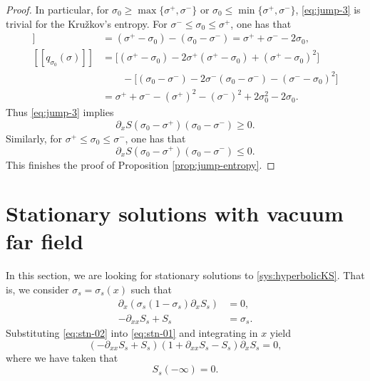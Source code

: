 \documentclass[12pt]{article}
\theoremstyle{definition}
\theoremstyle{remark}
\newcommand{\dx}{\partial_x}
\numberwithin{equation}{section}
\begin{document}
\begin{proof}
In particular, for $ \sigma_0 \geq \max\lbrace \sigma^+, \sigma^- \rbrace $ or $ \sigma_0 \leq \min\lbrace \sigma^+, \sigma^- \rbrace $, \eqref{eq:jump-3} is trivial for the Kru\v{z}kov's entropy. For $ \sigma^- \leq \sigma_0 \leq \sigma^+ $, one has that 
\begin{align*}
    [[\eta_{\sigma_0}(\sigma)]] &= (\sigma^+-\sigma_0) - (\sigma_0 - \sigma^-) = \sigma^+ + \sigma^- - 2 \sigma_0, \\
    [[q_{\sigma_0}(\sigma)]] & = \lbrack (\sigma^+ - \sigma_0) - 2 \sigma^+ ( \sigma^+ - \sigma_0) + (\sigma^+ - \sigma_0)^2 \rbrack \\
    & \qquad - \lbrack (\sigma_0 - \sigma^-) - 2 \sigma^- ( \sigma_0 - \sigma^- ) - (\sigma^- - \sigma_0)^2 \rbrack \\
    & = \sigma^+ + \sigma^- - (\sigma^+)^2 - (\sigma^-)^2 + 2 \sigma_0^2 - 2 \sigma_0.
\end{align*}
Thus \eqref{eq:jump-3} implies
\begin{equation}
\label{eq:jump-4}
    \dx S (\sigma_0 - \sigma^+) (\sigma_0 - \sigma^-) %
    \geq 0.
\end{equation}
Similarly, for $ \sigma^+ \leq \sigma_0 \leq \sigma^- $, one has that 
\begin{equation}
\label{eq:jump-5}
    \dx S (\sigma_0 - \sigma^+) (\sigma_0 - \sigma^-) %
    \leq 0.
\end{equation}
This finishes the proof of Proposition \ref{prop:jump-entropy}. 

\end{proof}



\section{Stationary solutions with vacuum far field}
\label{sec:stationary}

In this section, we are looking for stationary solutions to \eqref{sys:hyperbolicKS}. That is, we consider $ \sigma_s= \sigma_s(x) $ such that 
\begin{subequations}
    \label{sys:stationary}
    \begin{align}
        \label{eq:stn-01} \dx(\sigma_s (1-\sigma_s) \dx S_s) & = 0, \\
        \label{eq:stn-02} - \partial_{xx} S_s + S_s & = \sigma_s.  
    \end{align}
\end{subequations}
Substituting \eqref{eq:stn-02} into \eqref{eq:stn-01} and integrating in $ x $ yield
\begin{equation}
    \label{eq:stn-03}
    (-\partial_{xx} S_s + S_s)(1+\partial_{xx} S_s - S_s) \partial_x S_s = 0, 
\end{equation}
where we have taken that 
\begin{equation}
    \label{eq:stn-04}
    S_s(-\infty) = 0. 
\end{equation}
\end{document}
